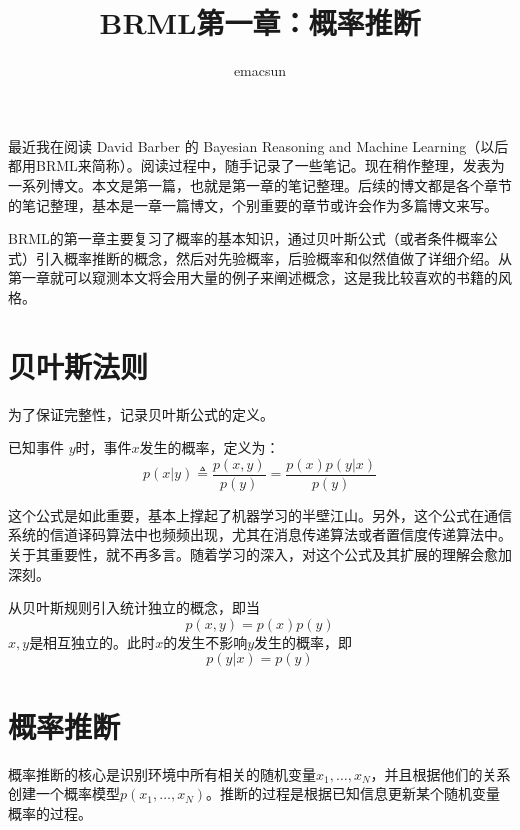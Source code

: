 \documentclass[10pt,a4paper,UTF8]{article}
\author{emacsun}
\date{}
\title{BRML第一章：概率推断}
\begin{document}
\maketitle
\tableofcontents

最近我在阅读 David Barber 的 Bayesian Reasoning and Machine Learning（以后都用BRML来简称）。阅读过程中，随手记录了一些笔记。现在稍作整理，发表为一系列博文。本文是第一篇，也就是第一章的笔记整理。后续的博文都是各个章节的笔记整理，基本是一章一篇博文，个别重要的章节或许会作为多篇博文来写。

BRML的第一章主要复习了概率的基本知识，通过贝叶斯公式（或者条件概率公式）引入概率推断的概念，然后对先验概率，后验概率和似然值做了详细介绍。从第一章就可以窥测本文将会用大量的例子来阐述概念，这是我比较喜欢的书籍的风格。


\section{贝叶斯法则}
\label{sec:org22c22ff}


为了保证完整性，记录贝叶斯公式的定义。

\begin{definition}
已知事件 \(y\)时，事件\(x\)发生的概率，定义为：\[p(x|y) \triangleq \frac{p(x,y)}{p(y)} = \frac{p(x)p(y|x)}{p(y)}\]
\end{definition}
这个公式是如此重要，基本上撑起了机器学习的半壁江山。另外，这个公式在通信系统的信道译码算法中也频频出现，尤其在消息传递算法或者置信度传递算法中。关于其重要性，就不再多言。随着学习的深入，对这个公式及其扩展的理解会愈加深刻。

从贝叶斯规则引入统计独立的概念，即当\[p(x,y) = p(x)p(y)\] \(x,y\)是相互独立的。此时\(x\)的发生不影响\(y\)发生的概率，即\[p(y|x) = p(y)\]

\section{概率推断}
\label{sec:orgdd14d83}


概率推断的核心是识别环境中所有相关的随机变量\(x_{1},\ldots ,x_{N}\)，并且根据他们的关系创建一个概率模型\(p(x_{1},\ldots ,x_{N})\)。推断的过程是根据已知信息更新某个随机变量概率的过程。
\end{document}
